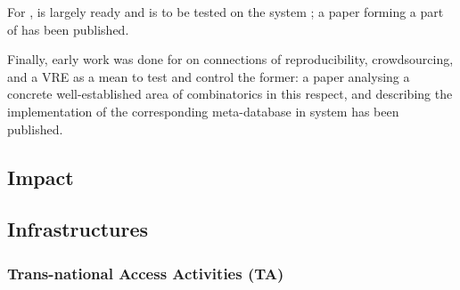 \documentclass{deliverablereport}
\begin{document}
For ,
 is largely ready and is to
be tested on the system \Sage; a paper
\cite{Pavlou:2016:MCI:2936924.2936934} forming a part of
 has been published.

Finally, early work was done for
 on connections of
reproducibility, crowdsourcing, and a VRE as a mean to test and
control the former: a paper \cite{2016arXiv160100181C} analysing a
concrete well-established area of combinatorics in this respect, and
describing the implementation of the corresponding meta-database in
\Sage system has been published.

\subsection{Impact}

\subsection{Infrastructures}

\subsubsection{Trans-national Access Activities (TA)}



\end{document}
